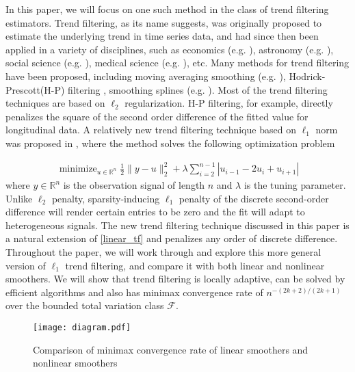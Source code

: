 \documentclass[a4paper]{article}
\newcommand{\RR}{\mathbb{R}}
\renewcommand{\cal}{\mathcal}
\DeclareMathOperator*{\minimize}{minimize}
\begin{document}
In this paper, we will focus on one such method in the class of trend filtering estimators. Trend filtering, as its name suggests, was originally proposed to estimate the underlying trend in time series data, and had since then been applied in a variety of disciplines, such as economics (e.g. \cite{hodrick1997postwar,tsay2005analysis}), astronomy (e.g. \cite{kovacs2008application}), social science (e.g. \cite{saha2012learning,levitt2004understanding}), medical science (e.g. \cite{greenland1992methods,link1994estimating}), etc. Many methods for trend filtering have been proposed, including moving averaging smoothing (e.g. \cite{leser1961simple,kendall1946advanced,lucas1980two}), Hodrick-Prescott(H-P) filtering \cite{hodrick1997postwar},  smoothing splines (e.g. \cite{de1978practical,wahba1990spline,green1993nonparametric}). Most of the trend filtering techniques are based on $\ell_2$ regularization. H-P filtering, for example, directly penalizes the square of the second order difference of the fitted value for longitudinal data. A relatively new trend filtering technique based on $\ell_1$ norm was proposed in \cite{kim2009ell_1}, where the method solves the following optimization problem 

\begin{align}
\minimize_{u\in\RR^n} \frac{1}{2}\|y-u\|_2^2 + \lambda\sum_{i=2}^{n-1} |u_{i-1} - 2u_i + u_{i+1}|  \label{linear_tf}
\end{align}
where $y\in\RR^n$ is the observation signal of length $n$ and $\lambda$ is the tuning parameter. Unlike $\ell_2$ penalty, sparsity-inducing $\ell_1$ penalty of the discrete second-order difference will render certain entries to be zero and the fit will adapt to heterogeneous signals. The new trend filtering technique discussed in this paper is a natural extension of \eqref{linear_tf} and penalizes any order of discrete difference. Throughout the paper, we will work through and explore this more general version of $\ell_1$ trend filtering, and compare it with both linear and nonlinear smoothers. We will show that trend filtering is locally adaptive, can be solved by efficient algorithms and also has minimax convergence rate of $n^{-(2k+2)/(2k+1)}$ over the bounded total variation class $\cal{F}$.

\begin{figure}[t!]
\centering
\texttt{[image: diagram.pdf]}
\caption{Comparison of minimax convergence rate of linear smoothers and nonlinear smoothers}
\label{fig:diagram}
\end{figure}
 
\end{document}
